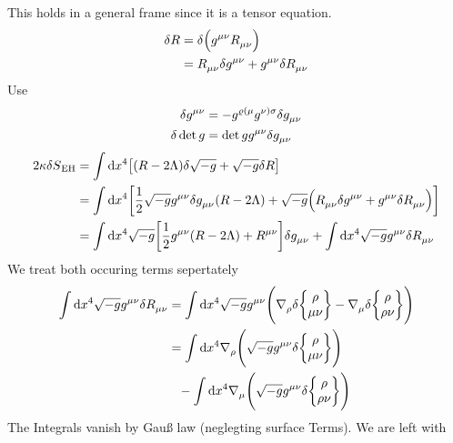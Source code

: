 This holds in a general frame since it is a tensor equation.
\begin{equation}
\begin{split}
\delta R &=\delta \left(\tensor{g}{^\mu^\nu}\tensor{R}{_\mu_\nu}\right)\\
&=\tensor{R}{_\mu_\nu}\delta\tensor{g}{^\mu^\nu}
+\tensor{g}{^\mu^\nu}\delta\tensor{R}{_\mu_\nu}\\
\end{split}
\end{equation}
Use 
\begin{align}
\delta\tensor{g}{^\mu^\nu}
&=-\tensor{g}{^\varrho^{(\mu}}\tensor{g}{^{\nu)}^\sigma}\delta\tensor{g}{_\mu_\nu}\\
\delta\det g&=\det g \tensor{g}{^\mu^\nu}\delta
\tensor{g}{_\mu_\nu}
\end{align}
\begin{equation}
\begin{split}
2\kappa\delta S\textsubscript{EH}
&=\int\dif x^4\left[
(R-2\Lambda)\delta\sqrt{-g}+\sqrt{-g}\delta R\right]\\
&=\int\dif x^4\left[
\frac{1}{2}\sqrt{-g}\tensor{g}{^\mu^\nu}\delta\tensor{g}{_\mu_\nu}
(R-2\Lambda)+\sqrt{-g}\left(\tensor{R}{_\mu_\nu}\delta\tensor{g}{^\mu^\nu}
+\tensor{g}{^\mu^\nu}\delta\tensor{R}{_\mu_\nu}\right)\right]\\
&=\int\dif x^4\sqrt{-g}\left[
\frac{1}{2}\tensor{g}{^\mu^\nu}
(R-2\Lambda)+\tensor{R}{^\mu^\nu}\right]\delta\tensor{g}{_\mu_\nu}
+\int\dif x^4\sqrt{-g}\tensor{g}{^\mu^\nu}\delta\tensor{R}{_\mu_\nu}
\\
\end{split}
\end{equation}
We treat both occuring terms sepertately
\begin{equation}
\begin{split}
\int\dif x^4\sqrt{-g}\tensor{g}{^\mu^\nu}\delta\tensor{R}{_\mu_\nu}
&=\int\dif x^4\sqrt{-g}\tensor{g}{^\mu^\nu}\left(\tensor{\nabla}{_\rho}\delta
\cSym{\rho}{\mu}{\nu} -\tensor{\nabla}{_\mu}\delta \cSym{\rho}{\rho}{\nu}\right)
\\
&=\int\dif 
x^4\tensor{\nabla}{_\rho}\left(\sqrt{-g}\tensor{g}{^\mu^\nu}\delta
\cSym{\rho}{\mu}{\nu}\right)\\
&\phantom{=}-\int\dif
x^4\tensor{\nabla}{_\mu}\left(\sqrt{-g}\tensor{g}{^\mu^\nu}\delta
\cSym{\rho}{\rho}{\nu}\right)
\end{split}
\end{equation}
The Integrals vanish by Gauß law (neglegting surface Terms). We are left with
